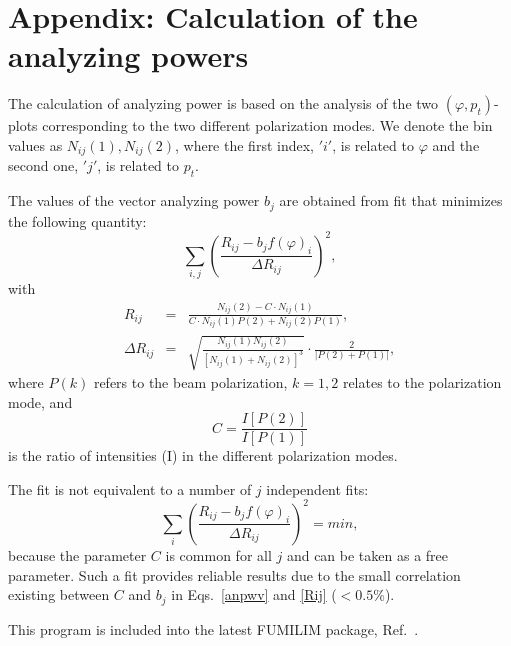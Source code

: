 \documentclass[epj]{svjour}
\begin{document}
%
\section{Appendix: Calculation of the analyzing powers}

The calculation of analyzing power is based on the analysis of the two $(\varphi,p_t)$-plots
corresponding to the two different polarization modes. We denote the bin values as $N_{ij}(1),N_{ij}(2)$,
where the first index, $'i'$, is related to $\varphi$ and  the second one, $'j'$, is related to $p_t$.

The values of the vector analyzing power $b_j$ are obtained from fit that minimizes the following quantity:
\begin{equation}\label{anpwv}
    \sum_{i,j} \left(\frac{R_{ij}-b_jf(\varphi)_i}{\Delta R_{ij}}\right)^2,
\end{equation}
with
\begin{eqnarray}
  \label{Rij}
  R_{ij} &=& \frac{N_{ij}(2)-C\cdot N_{ij}(1)}
   {C\cdot N_{ij}(1)P(2)+N_{ij}(2)P(1)},\\
  \Delta R_{ij} &=& \sqrt{\frac{N_{ij}(1)N_{ij}(2)}{[N_{ij}(1)+N_{ij}(2)]^3}}\cdot\frac{2}{|P(2)+P(1)|},
\end{eqnarray}
where
$P(k)$ refers to the beam polarization, $k=1,2$ relates to the polarization mode, and 
$$C=\frac{I[P(2)]}{I[P(1)]}$$
 is the ratio of intensities (I) in the different polarization modes. 

The fit is not equivalent to a number of $j$ independent fits: 
\begin{equation}\label{anpwvs}
    \sum_{i} \left(\frac{R_{ij}-b_jf(\varphi)_i}{\Delta R_{ij}}\right)^2 = min, 
\end{equation}
because the parameter $C$ is common for all $j$ and can be taken as a free parameter.
Such a fit provides reliable results due to the small correlation existing  between $C$ and $b_j$ in Eqs.~\ref{anpwv} and \ref{Rij} ($<0.5$\%).

This program is included into the latest FUMILIM package, Ref.~\cite{Sitnik:2016xxx}.




%
 
%
\end{document}
